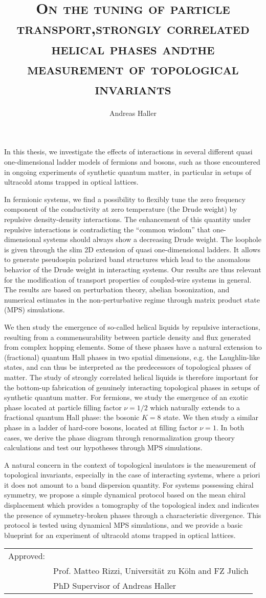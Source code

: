 \documentclass{article}
\title{\scshape On the tuning of particle transport,\linebreak strongly correlated  helical phases and\linebreak the measurement of topological invariants}
\author{Andreas Haller}
\date{}
\begin{document}
\maketitle
\thispagestyle{empty}


In this thesis, we investigate the effects of interactions in several different quasi one-di\-men\-sional ladder models of fermions and bosons, such as those encountered in ongoing experiments of synthetic quantum matter, in particular in setups of ultracold atoms trapped in optical lattices.\bigskip

In fermionic systems, we find a possibility to flexibly tune the zero frequency component of the conductivity at zero temperature (the Drude weight) by repulsive density-density interactions.
The enhancement of this quantity under repulsive interactions is contradicting the ``common wisdom'' that one-dimensional systems should always show a decreasing Drude weight.
The loophole is given through the slim 2D extension of quasi one-dimensional ladders.
It allows to generate pseudospin polarized band structures which lead to the anomalous behavior of the Drude weight in interacting systems.
Our results are thus relevant for the modification of transport properties of coupled-wire systems in general.
The results are based on perturbation theory, abelian bosonization, and numerical estimates in the non-perturbative regime through matrix product state (MPS) simulations.\bigskip

We then study the emergence of so-called helical liquids by repulsive interactions, resulting from a commensurability between particle density and flux generated from complex hopping elements.
Some of these phases have a natural extension to (fractional) quantum Hall phases in two spatial dimensions, e.g. the Laughlin-like states, and can thus be interpreted as the predecessors of topological phases of matter.
The study of strongly correlated helical liquids is therefore important for the bottom-up fabrication of genuinely interacting topological phases in setups of synthetic quantum matter.
For fermions, we study the emergence of an exotic phase located at particle filling factor $\nu=1/2$ which naturally extends to a fractional quantum Hall phase: the bosonic $K=8$ state.
We then study a similar phase in a ladder of hard-core bosons, located at filling factor $\nu=1$.
In both cases, we derive the phase diagram through renormalization group theory calculations and test our hypotheses through MPS simulations.\bigskip

A natural concern in the context of topological insulators is the measurement of topological invariants, especially in the case of interacting systems, where a priori it does not amount to a band dispersion quantity.
For systems possessing chiral symmetry, we propose a simple dynamical protocol based on the mean chiral displacement which provides a tomography of the topological index and indicates the presence of symmetry-broken phases through a characteristic divergence.
This protocol is tested using dynamical MPS simulations, and we provide a basic blueprint for an experiment of ultracold atoms trapped in optical lattices.
\bigskip\bigskip\bigskip\smallskip
%

\begin{tabular}{@{}p{.5in}p{3.5in}@{}}
Approved: & \hrulefill \\
& Prof. Matteo Rizzi,
Universität zu Köln and FZ Julich \\
& PhD Supervisor of Andreas Haller\\
\end{tabular}
\end{document}
